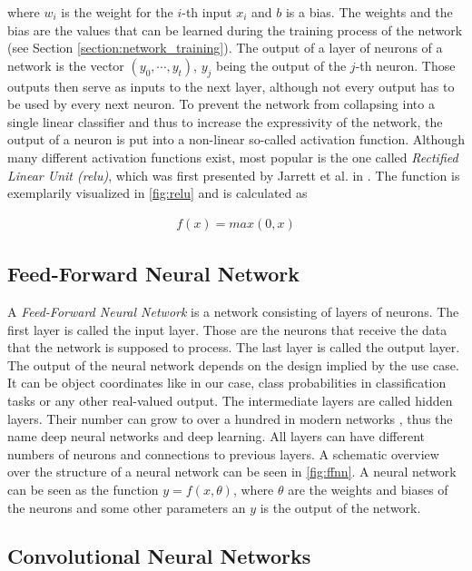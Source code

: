 where $w_i$ is the weight for the $i$-th input $x_i$ and $b$ is a bias. The weights and the bias are the values that can be learned during the training process of the network (see Section \ref{section:network_training}). The output of a layer of neurons of a network is the vector $(y_0, \cdots, y_t)$, $y_j$ being the output of the $j$-th neuron. Those outputs then serve as inputs to the next layer, although not every output has to be used by every next neuron. To prevent the network from collapsing into a single linear classifier and thus to increase the expressivity of the network, the output of a neuron is put into a non-linear so-called activation function. Although many different activation functions exist, most popular is the one called \textit{Rectified Linear Unit (\gls{relu})}, which was first presented by Jarrett et al. in \cite{relu}. The function is exemplarily visualized in \fig \ref{fig:relu} and is calculated as

\begin{align}
f(x) = max(0, x)
\end{align} 

\subsection{Feed-Forward Neural Network}

A \textit{Feed-Forward Neural Network} is a network consisting of layers of neurons. The first layer is called the input layer. Those are the neurons that receive the data that the network is supposed to process. The last layer is called the output layer. The output of the neural network depends on the design implied by the use case. It can be object coordinates like in our case, class probabilities in classification tasks or any other real-valued output. The intermediate layers are called hidden layers. Their number can grow to over a hundred in modern networks \cite{resnet}, thus the name deep neural networks and deep learning. All layers can have different numbers of neurons and connections to previous layers. A schematic overview over the structure of a neural network can be seen in \fig \ref{fig:ffnn}. A neural network can be seen as the function $y=f(x,\theta)$, where $\theta$ are the weights and biases of the neurons and some other parameters an $y$ is the output of the network.

\subsection{Convolutional Neural Networks}

